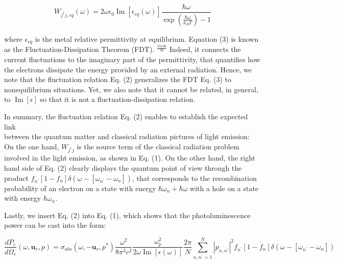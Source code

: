 \documentclass[10pt]{article}
\begin{document}
\begin{equation*}
W_{j^{\dagger} j, e q}(\omega)=2 \omega \epsilon_{0} \operatorname{Im}\left[\epsilon_{e q}(\omega)\right] \frac{\hbar \omega}{\exp \left(\frac{\hbar \omega}{k_{B} T}\right)-1} \tag{3}
\end{equation*}


where $\epsilon_{e q}$ is the metal relative permittivity at equilibrium. Equation (3) is known as the Fluctuation-Dissipation Theorem (FDT). ${ }^{\frac{35136}{36}}$ Indeed, it connects the current fluctuations to the imaginary part of the permittivity, that quantifies how the electrons dissipate the energy provided by an external radiation. Hence, we note that the fluctuation relation Eq. (2) generalizes the FDT Eq. (3) to nonequilibrium situations. Yet, we also note that it cannot be related, in general, to $\operatorname{Im}[\epsilon]$ so that it is not a fluctuation-dissipation relation.

In summary, the fluctuation relation Eq. (2) enables to establish the expected link\\
between the quantum matter and classical radiation pictures of light emission: On the one hand, $W_{j^{\dagger} j}$ is the source term of the classical radiation problem involved in the light emission, as shown in Eq. (1). On the other hand, the right hand side of Eq. (2) clearly displays the quantum point of view through the product $f_{n^{\prime}}\left[1-f_{n}\right] \delta\left(\omega-\left[\omega_{n^{\prime}}-\omega_{n}\right]\right)$, that corresponds to the recombination probability of an electron on a state with energy $\hbar \omega_{n}+\hbar \omega$ with a hole on a state with energy $\hbar \omega_{n}$.

Lastly, we insert Eq. (2) into Eq. (1), which shows that the photoluminescence power can be cast into the form:


\begin{equation*}
\frac{d P_{e}}{d \Omega_{r}}\left(\omega, \boldsymbol{u}_{r}, p\right)=\sigma_{a b s}\left(\omega,-\boldsymbol{u}_{r}, p^{*}\right) \frac{\omega^{2}}{8 \pi^{3} c^{2}} \frac{\omega_{p}^{2}}{2 \omega \operatorname{Im}[\epsilon(\omega)]} \frac{2 \pi}{N} \sum_{n, n^{\prime}=1}^{N}\left|p_{n, n^{\prime}}\right|^{2} f_{n^{\prime}}\left[1-f_{n}\right] \delta\left(\omega-\left[\omega_{n^{\prime}}-\omega_{n}\right]\right) \tag{4}
\end{equation*}
\end{document}
